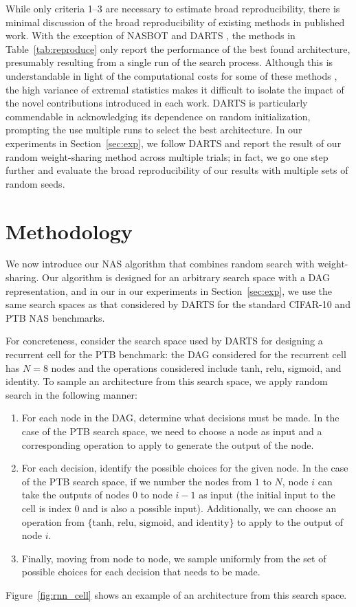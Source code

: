 \documentclass[acmlarge, nonacm]{acmart}
\begin{document}
While only criteria 1--3 are necessary to estimate broad reproducibility, there is minimal discussion of the broad reproducibility of existing methods in published work.  With the exception of NASBOT \citep{Kandasamy2018} and DARTS \citep{liu2018darts}, the methods in Table~\ref{tab:reproduce} only report the performance of the best found architecture, presumably resulting from a single run of the search process.  Although this is understandable in light of the computational costs for some of these methods \citep{Luo2018, cai2018path}, the high variance of extremal statistics makes it difficult to isolate the impact of the novel contributions introduced in each work.  DARTS is  particularly commendable in acknowledging its dependence on random initialization, prompting the use multiple runs to select the best architecture.  In our experiments in Section~\ref{sec:exp}, we follow DARTS and report the result of our random weight-sharing method across multiple trials; in fact,  we go one step further and evaluate the broad reproducibility of our results with multiple sets of random seeds.  


\section{Methodology}
\label{sec:alg}

We now introduce our NAS algorithm that combines random search with weight-sharing. Our algorithm is designed for an arbitrary search space with a DAG representation, and in our in our experiments in Section~\ref{sec:exp}, we use the same search spaces as that considered by DARTS \citep{liu2018darts} for the standard CIFAR-10 and PTB NAS benchmarks. 

For concreteness, consider the search space used by DARTS for designing a recurrent cell for the PTB benchmark: the DAG considered for the recurrent cell has $N=8$ nodes and the operations considered include tanh, relu, sigmoid, and identity.
To sample an architecture from this search space, we apply random search in the following manner: 

\begin{enumerate}[leftmargin=*]
    \item For each node in the DAG, determine what decisions must be made.  In the case of the PTB search space, we need to choose a node as input and a corresponding operation to apply to generate the output of the node. 
    \item For each decision, identify the possible choices for the given node. In the case of the PTB search space, if we number the nodes from $1$ to $N$, node $i$ can take the outputs of nodes $0$ to node $i-1$ as input (the initial input to the cell is index 0 and is also a possible input).   Additionally, we can choose an operation from $\{\text{tanh, relu, sigmoid, and identity}\}$ to apply to the output of node $i$.  
    \item Finally, moving from node to node, we sample uniformly from the set of possible choices for each decision that needs to be made.
\end{enumerate}
Figure~\ref{fig:rnn_cell} shows an example of an architecture from this search space.
\end{document}

